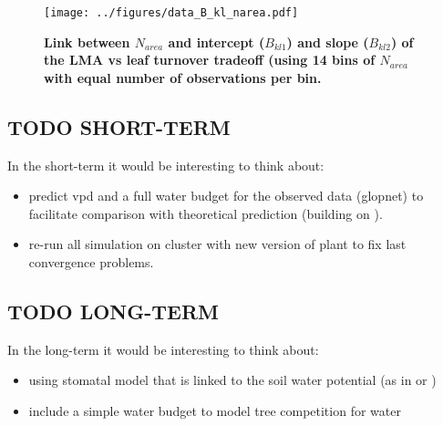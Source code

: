 \documentclass[a4paper,11pt]{article}
\begin{document}
\begin{figure}[ht]
\centering
\texttt{[image: ../figures/data\_B\_kl\_narea.pdf]}
\caption{\textbf{Link between $N_{area}$ and intercept ($B_{kl1}$) and slope ($B_{kl2}$) of the LMA vs leaf turnover tradeoff (using 14 bins of $N_{area}$ with equal number of observations per bin.}
\label{fig:narea_intercept}}
\end{figure}


\clearpage

\subsection{TODO SHORT-TERM}

In the short-term it would be interesting to think about:

\begin{itemize}

\item predict vpd and a full water budget for the observed data (glopnet) to facilitate comparison with theoretical prediction (building on \citet{Prentice-2014}).

\item re-run all simulation on cluster with new version of plant to fix last convergence problems.

\end{itemize}


\subsection{TODO LONG-TERM}

In the long-term it would be interesting to think about:

\begin{itemize}


\item using stomatal model that is linked to the soil water potential (as in \citet{Sperry-2016} or
\citet{Sterck-2011})

\item include a simple water budget to model tree competition for water

\end{itemize}



\end{document}
